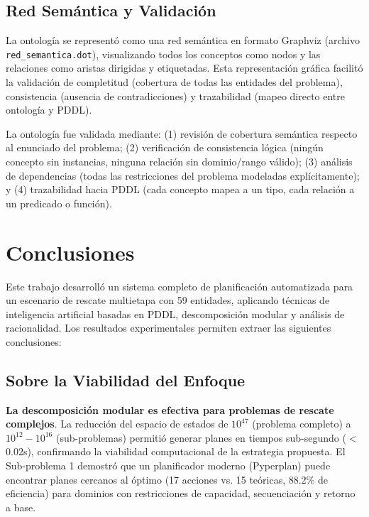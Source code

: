 \documentclass[conference]{IEEEtran}
\begin{document}
    \subsection{Red Semántica y Validación}

    La ontología se representó como una red semántica en formato Graphviz (archivo \texttt{red\_semantica.dot}), visualizando todos los conceptos como nodos y las relaciones como aristas dirigidas y etiquetadas. Esta representación gráfica facilitó la validación de completitud (cobertura de todas las entidades del problema), consistencia (ausencia de contradicciones) y trazabilidad (mapeo directo entre ontología y PDDL).

    La ontología fue validada mediante: (1) revisión de cobertura semántica respecto al enunciado del problema; (2) verificación de consistencia lógica (ningún concepto sin instancias, ninguna relación sin dominio/rango válido); (3) análisis de dependencias (todas las restricciones del problema modeladas explícitamente); y (4) trazabilidad hacia PDDL (cada concepto mapea a un tipo, cada relación a un predicado o función).

    \section{Conclusiones}

    Este trabajo desarrolló un sistema completo de planificación automatizada para un escenario de rescate multietapa con 59 entidades, aplicando técnicas de inteligencia artificial basadas en PDDL, descomposición modular y análisis de racionalidad. Los resultados experimentales permiten extraer las siguientes conclusiones:

    \subsection{Sobre la Viabilidad del Enfoque}

    \textbf{La descomposición modular es efectiva para problemas de rescate complejos}. La reducción del espacio de estados de $10^{47}$ (problema completo) a $10^{12}-10^{16}$ (sub-problemas) permitió generar planes en tiempos sub-segundo ($<$0.02s), confirmando la viabilidad computacional de la estrategia propuesta. El Sub-problema 1 demostró que un planificador moderno (Pyperplan) puede encontrar planes cercanos al óptimo (17 acciones vs. 15 teóricas, 88.2\% de eficiencia) para dominios con restricciones de capacidad, secuenciación y retorno a base.
\end{document}
